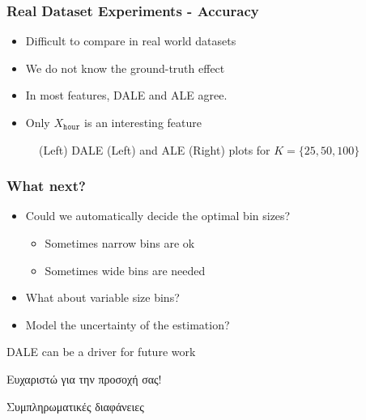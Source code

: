 \begin{frame}
  \frametitle{Real Dataset Experiments - Accuracy}
  \begin{itemize}
  \item Difficult to compare in real world datasets
  \item We do not know the ground-truth effect
  \item In most features, DALE and ALE agree.
  \item Only \(X_{\mathtt{hour}}\) is an interesting feature
  \end{itemize}

  \begin{figure}[h]
    \centering
    \resizebox{.3\columnwidth}{!}{}
    \resizebox{.3\columnwidth}{!}{}
    \caption{(Left) DALE (Left) and ALE (Right) plots for
      \(K = \{25, 50, 100\}\)}
  \end{figure}

\end{frame}

\begin{frame}
  \frametitle{What next?}
  \begin{itemize}
  \item Could we automatically decide the optimal bin sizes?
    \begin{itemize}
    \item Sometimes narrow bins are ok
    \item Sometimes wide bins are needed
    \end{itemize}
  \item What about variable size bins?
  \item Model the uncertainty of the estimation?
  \end{itemize}

  \noindent\makebox[\linewidth]{\rule{\paperwidth}{0.4pt}}
  DALE can be a driver for future work
\end{frame}


\begin{frame}[plain,c]
  \Large Ευχαριστώ για την προσοχή σας!
\end{frame}

\begin{frame}[plain,c]
  \Large Συμπληρωματικές διαφάνειες
\end{frame}


